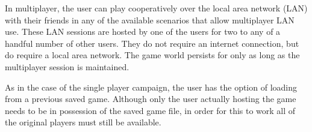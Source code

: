

In multiplayer, the user can play cooperatively over the local area network (LAN) with their friends in any of the available scenarios that allow multiplayer LAN use. These LAN sessions are hosted by one of the users for two to any of a handful number of other users. They do not require an internet connection, but do require a local area network. The game world persists for only as long as the multiplayer session is maintained.

As in the case of the single player campaign, the user has the option of loading from a previous saved game. Although only the user actually hosting the game needs to be in possession of the saved game file, in order for this to work all of the original players must still be available. 

